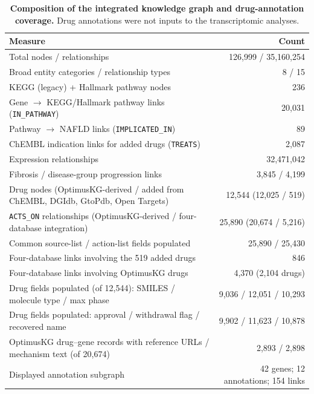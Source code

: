 \documentclass[10pt,a4paper]{article}
\newcommand{\tabsetup}{\sffamily\footnotesize\rowcolors{2}{zebra}{white}\renewcommand{\arraystretch}{1.25}\arrayrulecolor{rule}}
\begin{document}
\begin{table}[h]\centering
\caption{\textbf{Composition of the integrated knowledge graph and drug-annotation coverage.} Drug annotations were not inputs to the transcriptomic analyses.}
\tabsetup
\begin{tabular}{l r}
\toprule
\rowcolor{white}\textbf{Measure} & \textbf{Count} \\
\midrule
Total nodes / relationships & 126,999 / 35,160,254 \\
Broad entity categories / relationship types & 8 / 15 \\
KEGG (legacy) + Hallmark pathway nodes & 236 \\
Gene $\rightarrow$ KEGG/Hallmark pathway links (\texttt{IN\_PATHWAY}) & 20,031 \\
Pathway $\rightarrow$ NAFLD links (\texttt{IMPLICATED\_IN}) & 89 \\
ChEMBL indication links for added drugs (\texttt{TREATS}) & 2,087 \\
Expression relationships & 32,471,042 \\
Fibrosis / disease-group progression links & 3,845 / 4,199 \\
Drug nodes (OptimusKG-derived / added from ChEMBL, DGIdb, GtoPdb, Open Targets) & 12,544 (12,025 / 519) \\
\texttt{ACTS\_ON} relationships (OptimusKG-derived / four-database integration) & 25,890 (20,674 / 5,216) \\
Common source-list / action-list fields populated & 25,890 / 25,430 \\
Four-database links involving the 519 added drugs & 846 \\
Four-database links involving OptimusKG drugs & 4,370 (2,104 drugs) \\
Drug fields populated (of 12,544): SMILES / molecule type / max phase & 9,036 / 12,051 / 10,293 \\
Drug fields populated: approval / withdrawal flag / recovered name & 9,902 / 11,623 / 10,878 \\
OptimusKG drug--gene records with reference URLs / mechanism text (of 20,674) & 2,893 / 2,898 \\
Displayed annotation subgraph & 42 genes; 12 annotations; 154 links \\
\bottomrule
\end{tabular}
\par{}
\end{table}
\end{document}
